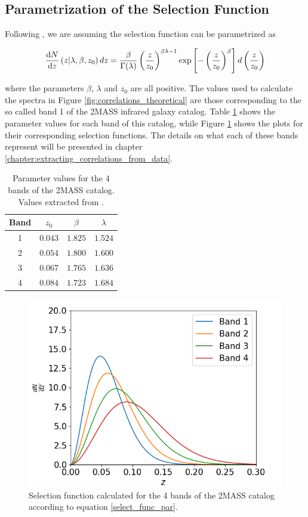 \documentclass[openany,a4paper,12pt,oneside]{book}
\begin{document}
\begin{spacing}{1.5}
\section{Parametrization of the Selection Function}\label{sect:sel_func_par}

Following \cite{cross_corr:Afshordi}, we are assuming the selection function can be parametrized as

\begin{equation}\label{select_func_par}
\dv{N}{z}\left(z|\lambda, \beta, z_0\right)dz=\frac{\beta}{\Gamma(\lambda)}\left(\frac{z}{z_0}\right)^{\beta\lambda-1}\text{exp}\left[-\left(\frac{z}{z_0}\right)^\beta\right]d\left(\frac{z}{z_0}\right)
\end{equation}

\noindent where the parameters $\beta$, $\lambda$ and $z_0$ are all positive. The values used to calculate the spectra in Figure \ref{fig:correlations_theoretical} are those corresponding to the so called band 1 of the 2MASS infrared galaxy catalog. Table \ref{tab:bands_2MASS} shows the parameter values for each band of this catalog, while Figure \ref{fig:2MASS_selections} shows the plots for their corresponding selection functions. The details on what each of these bands represent will be presented in chapter \ref{chapter:extracting_correlations_from_data}.

\begin{table}[!htb]
\centering
    \begin{tabular}{cccc} \hline
     Band & $z_0$ & $\beta$ & $\lambda$ \\ \hline
     1 & $0.043$ & $1.825$ & $1.524$\\
     2 & $0.054$ & $1.800$ & $1.600$ \\
     3 & $0.067$ & $1.765$ & $1.636$\\
     4 & $0.084$ & $1.723$ & $1.684$\\ \hline
    \end{tabular}
    \caption{Parameter values for the 4 bands of the 2MASS catalog. Values extracted from \cite{cross_corr:Afshordi}.}
    \label{tab:bands_2MASS}
\end{table}

\begin{figure}[!htb]
	\centering
	\includegraphics[width=.7\linewidth]{Imagens/selection_2MASS.png}
	\caption{Selection function calculated for the 4 bands of the 2MASS catalog according to equation \eqref{select_func_par}.}
	\label{fig:2MASS_selections}
\end{figure}


\end{spacing}
\end{document}
